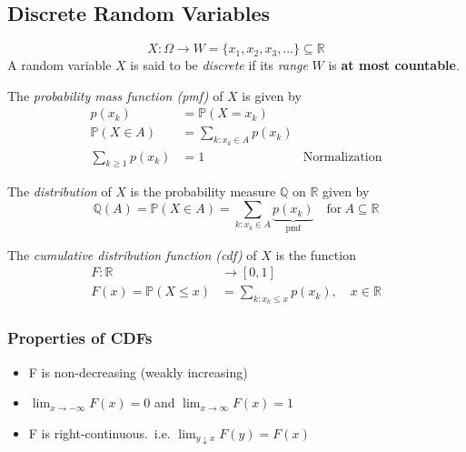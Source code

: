 \subsection{Discrete Random Variables}
\noindent\begin{equation*}
    X:\Omega\rightarrow W=\{x_1,x_2,x_3,\ldots\}\subseteq\mathbb{R}
\end{equation*}
A random variable $X$ is said to be \textit{discrete} if its \textit{range} $W$ is \textbf{at most countable}.
\newpar{}

The \textit{probability mass function (pmf)} of $X$ is given by
\noindent\begin{align*}
    p(x_{k})            & =\mathbb{P}(X=x_{k})                            \\
    \mathbb{P}(X\in A)  & =\sum_{k:x_k\in A}p(x_k)                        \\
    \sum_{k\geq1}p(x_k) & =1                       & \text{Normalization}
\end{align*}

\newpar{}

The \textit{distribution} of $X$ is the probability measure $\mathbb{Q}$ on $\mathbb{R}$ given by
\noindent\begin{equation*}
    \mathbb{Q}(A)=\mathbb{P}(X\in A)=\sum_{k:x_k\in A} \underbrace{p(x_k)}_{\text{pmf}}\quad\mathrm{for~}A\subseteq\mathbb{R}
\end{equation*}

\newpar{}

The \textit{cumulative distribution function (cdf)} of $X$ is the function
\noindent\begin{align*}
    F:\mathbb{R}            & \rightarrow [0,1]                             \\
    F(x)=\mathbb P(X\leq x) & =\sum_{k:x_k\leq x}p(x_k),\quad x\in\mathbb R
\end{align*}

\subsubsection{Properties of CDFs}
\begin{itemize}
    \item F is non-decreasing (weakly increasing)
    \item $\lim_{x\rightarrow -\infty}F(x)=0$ and $\lim_{x\rightarrow \infty}F(x)=1$
    \item F is right-continuous.\ i.e. $\lim_{y\downarrow x} F(y) =F(x)$
\end{itemize}

